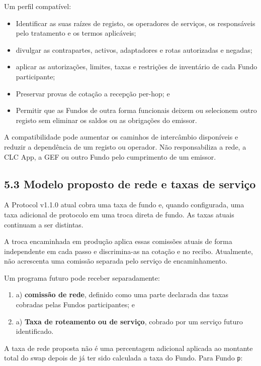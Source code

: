 \documentclass[11pt]{article}
\begin{document}
Um perfil compatível:

\begin{itemize}[leftmargin=*]
\item Identificar as suas raízes de registo, os operadores de serviços, os responsáveis pelo tratamento e os termos aplicáveis;
\item divulgar as contrapartes, activos, adaptadores e rotas autorizadas e negadas;
\item aplicar as autorizações, limites, taxas e restrições de inventário de cada Fundo participante;
\item Preservar provas de cotação a recepção per-hop; e
\item Permitir que as Fundos de outra forma funcionais deixem ou selecionem outro registo sem eliminar os saldos ou as obrigações do emissor.
\end{itemize}
A compatibilidade pode aumentar os caminhos de intercâmbio disponíveis e reduzir a dependência de um registo ou operador. Não responsabiliza a rede, a CLC App, a GEF ou outro Fundo pelo cumprimento de um emissor.

\subsection*{5.3 Modelo proposto de rede e taxas de serviço}

A Protocol v1.1.0 atual cobra uma taxa de fundo e, quando configurada, uma taxa adicional de protocolo em uma troca direta de fundo. As taxas atuais continuam a ser distintas.

A troca encaminhada em produção aplica essas comissões atuais de forma independente em cada passo e discrimina-as na cotação e no recibo. Atualmente, não acrescenta uma comissão separada pelo serviço de encaminhamento.

Um programa futuro pode receber separadamente:

\begin{enumerate}[leftmargin=*]
\item a) \textbf{comissão de rede}, definido como uma parte declarada das taxas cobradas pelas Fundos participantes; e
\item a) \textbf{Taxa de roteamento ou de serviço}, cobrado por um serviço futuro identificado.
\end{enumerate}
A taxa de rede proposta não é uma percentagem adicional aplicada ao montante total do swap depois de já ter sido calculada a taxa do Fundo. Para Fundo \texttt{p}:
\end{document}
